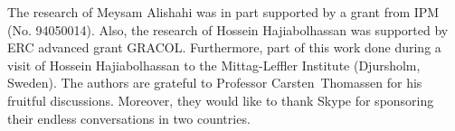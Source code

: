 \documentclass[11pt]{article}
\begin{document}
The research of Meysam Alishahi was in part supported by a grant from IPM (No. 94050014).  
Also, the research of Hossein Hajiabolhassan was supported by ERC advanced grant GRACOL. Furthermore, 
part of this work done during a visit of  Hossein Hajiabolhassan to the Mittag-Leffler Institute (Djursholm, Sweden). 
The authors are grateful to Professor Carsten~Thomassen for his fruitful discussions. 
Moreover, they would like to thank Skype for sponsoring their endless conversations in two countries. 
%
%
\def\cprime{$'$} \def\cprime{$'$}
\end{document}
